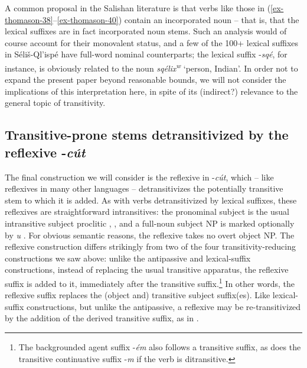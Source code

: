 \documentclass[output=paper,colorlinks,citecolor=brown]{langscibook}
\begin{document}
A common proposal in the Salishan literature is that verbs like those
in (\ref{ex-thomason-38}--\ref{ex-thomason-40}) contain an incorporated noun -- that is, that the lexical
suffixes are in fact incorporated noun stems.  Such an analysis would
of course account for their monovalent status, and a few of the 100+
lexical suffixes in S\'eli\v{s}-Ql'isp\'e have full-word nominal
counterparts; the lexical suffix -\emph{sq\'e}, for instance, is
obviously related to the noun \emph{sq\'elix\textsuperscript w}
`person, Indian'.  In order not to expand the present paper beyond
reasonable bounds, we will not consider the implications of this
interpretation here, in spite of its (indirect?) relevance to the
general topic of transitivity.

\subsection{Transitive-prone stems detransitivized by the reflexive
 -\emph{c\'ut}}   %
\label{thomason_section_2.9}

The final construction we will consider is the reflexive in
-\emph{c\'ut}, which -- like reflexives in many other
languages -- detransitivizes the potentially transitive stem to which
it is added.  As with verbs detransitivized by lexical suffixes, these
reflexives are straightforward intransitives: the pronominal subject
is the usual intransitive subject proclitic , , and a full-noun
subject NP is marked optionally by \emph{{\textltilde}u} .  For
obvious semantic reasons, the reflexive takes no overt object NP.  The
reflexive construction differs strikingly from two of the four
transitivity-reducing constructions we saw above: unlike the
antipassive and lexical-suffix constructions, instead of replacing the
usual transitive apparatus, the reflexive suffix is added to it,
immediately after the transitive suffix.\footnote{The backgrounded
agent suffix -\emph{\'em} also follows a transitive suffix, as does
the transitive continuative suffix -\emph{m} if the verb is
ditransitive.}  In other words, the reflexive suffix replaces the
(object and) transitive subject suffix(es).  Like lexical-suffix
constructions, but unlike the antipassive, a reflexive may be
re-transitivized by the addition of the derived transitive suffix, as
in .
\end{document}
